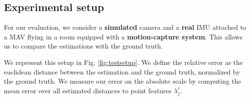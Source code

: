 \documentclass[letterpaper, 10 pt, conference]{ieeeconf}  %
\begin{document}
\subsection{Experimental setup}\label{SubsectionSetup}

For our evaluation, we consider a \textbf{simulated} camera and a \textbf{real} IMU attached to a MAV flying in a room equipped with a \textbf{motion-capture system}.
This allows us to compare the estimations with the ground truth.


We represent this setup in Fig. \ref{fig:testsetup}.
We define the relative error as the euclidean distance between the estimation and the ground truth,
normalized by the ground truth.
We measure our error on the absolute scale by computing the mean error over all estimated distances to point features $\lambda_j^i$.
\end{document}
